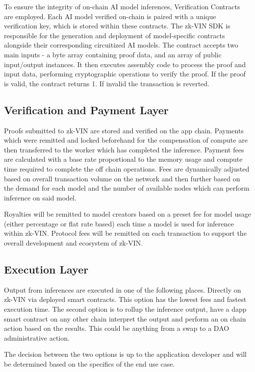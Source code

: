 \documentclass[conference]{IEEEtran}
\begin{document}
To ensure the integrity of on-chain AI model inferences, Verification Contracts are employed. Each AI model verified on-chain is paired with a unique verification key, which is stored within these contracts. The zk-VIN SDK is responsible for the generation and deployment of model-specific contracts alongside their corresponding circuitized AI models. The contract accepts two main inputs - a byte array containing proof data, and an array of public input/output instances. It then executes assembly code to process the proof and input data, performing cryptographic operations to verify the proof.  If the proof is valid, the contract returns 1. If invalid the transaction is reverted.

\subsection{Verification and Payment Layer}
Proofs submitted to zk-VIN are stored and verified on the app chain. Payments which were remitted and locked beforehand for the compensation of compute are then transferred to the worker which has completed the inference. Payment fees are calculated with a base rate proportional to the memory usage and compute time required to complete the off chain operations. Fees are dynamically adjusted based on overall transaction volume on the network and then further based on the demand for each model and the number of available nodes which can perform inference on said model.

Royalties will be remitted to model creators based on a preset fee for model usage (either percentage or flat rate based) each time a model is used for inference within zk-VIN. Protocol fees will be remitted on each transaction to support the overall development and ecosystem of zk-VIN.

\subsection{Execution Layer}
Output from inferences are executed in one of the following places. Directly on zk-VIN via deployed smart contracts. This option has the lowest fees and fastest execution time. The second option is to rollup the inference output, have a dapp smart contract on any other chain interpret the output and perform an on chain action based on the results. This could be anything from a swap to a DAO administrative action.

The decision between the two options is up to the application developer and will be determined based on the specifics of the end use case.
\end{document}
